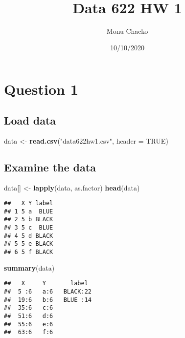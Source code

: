 \documentclass[
]{article}
\title{Data 622 HW 1}
\author{Monu Chacko}
\date{10/10/2020}
\newenvironment{Shaded}{\begin{snugshade}}{\end{snugshade}}
\newcommand{\DataTypeTok}[1]{\textcolor[rgb]{0.13,0.29,0.53}{#1}}
\newcommand{\KeywordTok}[1]{\textcolor[rgb]{0.13,0.29,0.53}{\textbf{#1}}}
\newcommand{\NormalTok}[1]{#1}
\newcommand{\OtherTok}[1]{\textcolor[rgb]{0.56,0.35,0.01}{#1}}
\newcommand{\StringTok}[1]{\textcolor[rgb]{0.31,0.60,0.02}{#1}}
\begin{document}
\maketitle

\hypertarget{question-1}{%
\section{Question 1}\label{question-1}}

\hypertarget{load-data}{%
\subsection{Load data}\label{load-data}}

\begin{Shaded}
\begin{Highlighting}[]
\NormalTok{data <-}\StringTok{ }\KeywordTok{read.csv}\NormalTok{(}\StringTok{"data622hw1.csv"}\NormalTok{, }\DataTypeTok{header =} \OtherTok{TRUE}\NormalTok{)}
\end{Highlighting}
\end{Shaded}

\hypertarget{examine-the-data}{%
\subsection{Examine the data}\label{examine-the-data}}

\begin{Shaded}
\begin{Highlighting}[]
\NormalTok{data[] <-}\StringTok{ }\KeywordTok{lapply}\NormalTok{(data, as.factor)}
\KeywordTok{head}\NormalTok{(data)}
\end{Highlighting}
\end{Shaded}

\begin{verbatim}
##   X Y label
## 1 5 a  BLUE
## 2 5 b BLACK
## 3 5 c  BLUE
## 4 5 d BLACK
## 5 5 e BLACK
## 6 5 f BLACK
\end{verbatim}

\begin{Shaded}
\begin{Highlighting}[]
\KeywordTok{summary}\NormalTok{(data)}
\end{Highlighting}
\end{Shaded}

\begin{verbatim}
##   X     Y       label   
##  5 :6   a:6   BLACK:22  
##  19:6   b:6   BLUE :14  
##  35:6   c:6             
##  51:6   d:6             
##  55:6   e:6             
##  63:6   f:6
\end{verbatim}
\end{document}
